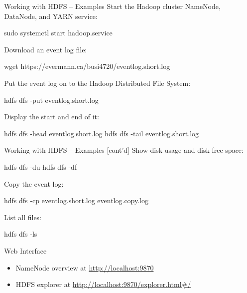 \documentclass[ignorenonframetext,xcolor=x11names]{beamer}
\begin{document}
\begin{frame}[fragile]{Working with HDFS -- Examples}
Start the Hadoop cluster NameNode, DataNode, and YARN service:
\begin{bashcode}
sudo systemctl start hadoop.service
\end{bashcode}
Download an event log file:
\begin{bashcode}
wget https://evermann.ca/busi4720/eventlog.short.log
\end{bashcode}
Put the event log on to the Hadoop Distributed File System:
\begin{bashcode}
hdfs dfs -put eventlog.short.log
\end{bashcode}
Display the start and end of it:
\begin{bashcode}
hdfs dfs -head eventlog.short.log
hdfs dfs -tail eventlog.short.log
\end{bashcode}
\end{frame}

\begin{frame}[fragile]{Working with HDFS -- Examples \small [cont'd]}
Show disk usage and disk free space:
\begin{bashcode}
hdfs dfs -du
hdfs dfs -df
\end{bashcode}
Copy the event log:
\begin{bashcode}
hdfs dfs -cp eventlog.short.log eventlog.copy.log
\end{bashcode}
List all files:
\begin{bashcode}
hdfs dfs -ls
\end{bashcode}
\begin{block}{Web Interface}
\begin{itemize}
\item NameNode overview at \url{http://localhost:9870}
\item HDFS explorer at \url{http://localhost:9870/explorer.html#/}
\end{itemize}
\end{block}
\end{frame}
\end{document}
